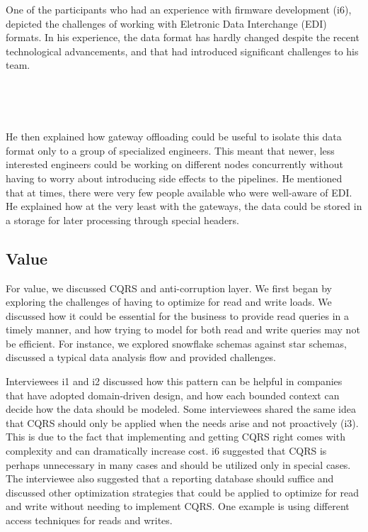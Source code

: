 \documentclass{bmcart}
\begin{document}
One of the participants who had an experience with firmware development (i6), depicted the challenges of working with Eletronic Data Interchange (EDI) formats. In his experience, the data format has hardly changed despite the recent technological advancements, and that had introduced significant challenges to his team. 

\,

\setlength{\fboxsep}{0.7em}
\noindent{}

\,

He then explained how gateway offloading could be useful to isolate this data format only to a group of specialized engineers. This meant that newer, less interested engineers could be working on different nodes concurrently without having to worry about introducing side effects to the pipelines. He mentioned that at times, there were very few people available who were well-aware of EDI. He explained how at the very least with the gateways, the data could be stored in a storage for later processing through special headers. 



\subsection{Value}

For value, we discussed CQRS and anti-corruption layer. We first began by exploring the challenges of having to optimize for read and write loads. We discussed how it could be essential for the business to provide read queries in a timely manner, and how trying to model for both read and write queries may not be efficient. For instance, we explored snowflake schemas against star schemas, discussed a typical data analysis flow and provided challenges.

Interviewees i1 and i2 discussed how this pattern can be helpful in companies that have adopted domain-driven design, and how each bounded context can decide how the data should be modeled. Some interviewees shared the same idea that CQRS should only be applied when the needs arise and not proactively (i3). This is due to the fact that implementing and getting CQRS right comes with complexity and can dramatically increase cost. i6 suggested that CQRS is perhaps unnecessary in many cases and should be utilized only in special cases. The interviewee also suggested that a reporting database should suffice and discussed other optimization strategies that could be applied to optimize for read and write without needing to implement CQRS. One example is using different access techniques for reads and writes. 
\end{document}
